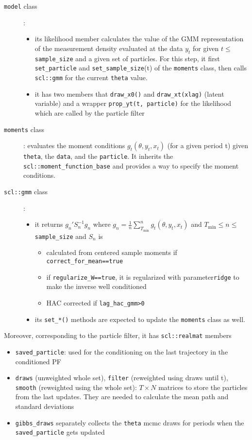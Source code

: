 \documentclass[11pt, letterpaper, notitlepage]{article}
\begin{document}
\begin{description}
\item[\texttt{model} class]: 

\begin{itemize}
\item its likelihood member calculates the value of the GMM representation of the measurement density evaluated at the data $y_t$ for given $t\leq$ \texttt{sample\_size} and a given set of particles. For this step, it first \texttt{set\_particle} and \texttt{set\_sample\_size}(t) of the \texttt{moments} class, then calls \texttt{scl::gmm} for the current \texttt{theta} value. 
\item it has two members that \texttt{draw\_x0()} and \texttt{draw\_xt(xlag)} (latent variable) and a wrapper \texttt{prop\_yt(t, particle)} for the likelihood which are called by the particle filter 
\end{itemize}
\item[\texttt{moments} class]: evaluates the moment conditions $g_t(\theta, y_t, x_t)$ (for a given period t) given \texttt{theta}, the \texttt{data}, and the \texttt{particle}. It inherits the \texttt{scl::moment\_function\_base} and provides a way to specify the moment conditions.
\item[\texttt{scl::gmm} class]:
 
\begin{itemize}
\item it returns $g_n'S_n^{-1} g_n$ where $g_n = \frac{1}{n}\sum_{T_{\min}}^{n} g_t(\theta, y_t, x_t)$ and $T_{\min}\leq n\leq$\texttt{sample\_size} and $S_n$ is 
\begin{itemize}
\item calculated from centered sample moments if \texttt{correct\_for\_mean==true}
\item if \texttt{regularize\_W==true}, it is regularized  with parameter\texttt{ridge} to make the inverse well conditioned
\item HAC corrected if \texttt{lag\_hac\_gmm>0}
\end{itemize}
\item its \texttt{set\_*()} methods are expected to update the \texttt{moments} class as well. 
\end{itemize}
\end{description}

Moreover, corresponding to the particle filter, it has \texttt{scl::realmat} members
\begin{itemize}
\item \texttt{saved\_particle}: used for the conditioning on the last trajectory in the conditioned PF
\item \texttt{draws} (unweighted whole set), \texttt{filter} (reweighted using draws until t), \texttt{smooth} (reweighted using the whole set): $T\times N$ matrices to store the particles from the last updates. They are needed to calculate the mean path and standard deviations
\item \texttt{gibbs\_draws} separately collects the \texttt{theta} mcmc draws for periods when the \texttt{saved\_particle} gets updated 
\end{itemize}
\end{document}
